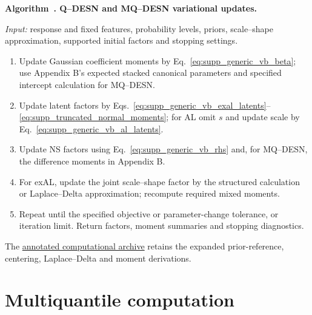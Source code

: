 \documentclass[12pt,letterpaper]{article}
\newif\ifQdesnAnonymous
\newcounter{suppalgorithm}
\numberwithin{suppalgorithm}{section}
\newenvironment{suppalgorithm}[1]{%
  \refstepcounter{suppalgorithm}%
  \par\medskip\noindent\textbf{Algorithm~\thesuppalgorithm. #1.}\par
  \nopagebreak[4]\smallskip\nopagebreak[4]
}{\par\medskip}
\numberwithin{equation}{section}
\numberwithin{table}{section}
\numberwithin{figure}{section}
\begin{document}
\begin{suppalgorithm}{Q--DESN and MQ--DESN variational updates}
\label{alg:qdesn_vb_ld}
\emph{Input:} response and fixed features, probability levels, priors,
scale--shape approximation, supported initial factors and stopping settings.
\begin{enumerate}[label=(\arabic*)]
\item Update Gaussian coefficient moments by
Eq.~\eqref{eq:supp_generic_vb_beta}; use Appendix B's expected stacked
canonical parameters and specified intercept calculation for MQ--DESN.
\item Update latent factors by
Eqs.~\eqref{eq:supp_generic_vb_exal_latents}--\eqref{eq:supp_truncated_normal_moments};
for AL omit \(s\) and update scale by
Eq.~\eqref{eq:supp_generic_vb_al_latents}.
\item Update NS factors using Eq.~\eqref{eq:supp_generic_vb_rhs} and,
for MQ--DESN, the difference moments in Appendix B.
\item For exAL, update the joint scale--shape factor by the structured
calculation or Laplace--Delta approximation; recompute required mixed moments.
\item Repeat until the specified objective or parameter-change tolerance,
or iteration limit. Return factors, moment summaries and stopping diagnostics.
\end{enumerate}
\end{suppalgorithm}

\ifQdesnAnonymous
Expanded prior-reference, centering, Laplace--Delta and moment derivations
are retained in the annotated computational materials.
\else
The \href{https://github.com/AntonioAPDL/Article-Q-DESN---Version-2/blob/main/docs/reproducibility/appendix_essential_archive_20261106.md}{annotated computational archive}
retains the expanded prior-reference, centering, Laplace--Delta and moment
derivations.
\fi

\section{Multiquantile computation}
\label{sec:joint_qdesn_supp}
\end{document}
